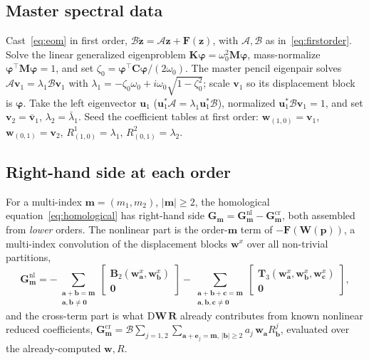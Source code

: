 \documentclass[11pt]{article}
\begin{document}
\subsection{Master spectral data}
Cast~\eqref{eq:eom} in first order, $\bm{\mathcal B}\dot{\bm z}=\bm{\mathcal A}\bm z
+\bm F(\bm z)$, with $\bm{\mathcal A},\bm{\mathcal B}$ as in~\eqref{eq:firstorder}.
Solve the linear generalized eigenproblem $\bm K\bm\varphi=\omega_0^2\bm M\bm\varphi$,
mass-normalize $\bm\varphi^{\!\top}\bm M\bm\varphi=1$, and set
$\zeta_0=\bm\varphi^{\!\top}\bm C\bm\varphi/(2\omega_0)$. The master pencil eigenpair
solves $\bm{\mathcal A}\bm v_1=\lambda_1\bm{\mathcal B}\bm v_1$ with
$\lambda_1=-\zeta_0\omega_0+i\omega_0\sqrt{1-\zeta_0^2}$; scale $\bm v_1$ so its
displacement block is $\bm\varphi$. Take the left eigenvector $\bm u_1$
($\bm u_1^{*}\bm{\mathcal A}=\lambda_1\bm u_1^{*}\bm{\mathcal B}$), normalized
$\bm u_1^{*}\bm{\mathcal B}\bm v_1=1$, and set $\bm v_2=\bar{\bm v}_1$,
$\lambda_2=\bar\lambda_1$. Seed the coefficient tables at first order:
$\bm w_{(1,0)}=\bm v_1$, $\bm w_{(0,1)}=\bm v_2$, $R^1_{(1,0)}=\lambda_1$,
$R^2_{(0,1)}=\lambda_2$.

\subsection{Right-hand side at each order}
For a multi-index $\bm m=(m_1,m_2)$, $|\bm m|\ge2$, the homological
equation~\eqref{eq:homological} has right-hand side
$\bm G_{\bm m}=\bm G^{\mathrm{nl}}_{\bm m}-\bm G^{\mathrm{cr}}_{\bm m}$, both assembled
from \emph{lower} orders. The nonlinear part is the order-$\bm m$ term of
$-\bm F(\bm W(\bm p))$, a multi-index convolution of the displacement blocks
$\bm w^{x}$ over all non-trivial partitions,
\begin{equation}
\bm G^{\mathrm{nl}}_{\bm m}=-\!\!\!\sum_{\substack{\bm a+\bm b=\bm m\\ \bm a,\bm b\ne\bm 0}}\!\!\!
\begin{bmatrix}\bm B_2(\bm w^{x}_{\bm a},\bm w^{x}_{\bm b})\\ \bm 0\end{bmatrix}
-\!\!\!\!\sum_{\substack{\bm a+\bm b+\bm c=\bm m\\ \bm a,\bm b,\bm c\ne\bm 0}}\!\!\!\!
\begin{bmatrix}\bm T_3(\bm w^{x}_{\bm a},\bm w^{x}_{\bm b},\bm w^{x}_{\bm c})\\ \bm 0\end{bmatrix},
\label{eq:app-forcing}
\end{equation}
and the cross-term part is what $\mathrm D\bm W\,\bm R$ already contributes from known
nonlinear reduced coefficients,
$\bm G^{\mathrm{cr}}_{\bm m}=\bm{\mathcal B}\sum_{j=1,2}\sum_{\bm a+\bm e_j=\bm m,\,|\bm b|\ge2}
a_j\,\bm w_{\bm a}R^{j}_{\bm b}$, evaluated over the already-computed $\bm w,R$.
\end{document}
